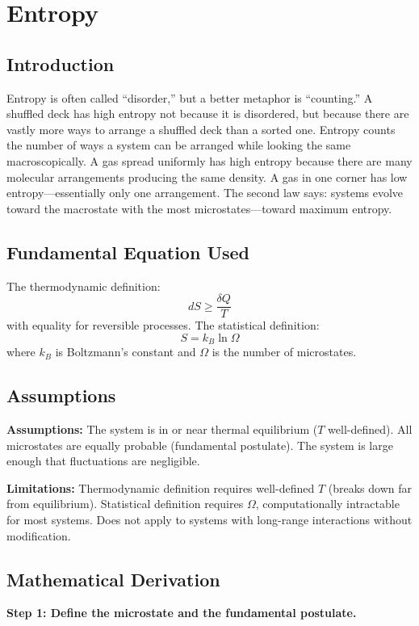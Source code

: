 \chapter{Entropy}

\section*{Introduction}

Entropy is often called ``disorder,'' but a better metaphor is ``counting.'' A shuffled deck has high entropy not because it is disordered, but because there are vastly more ways to arrange a shuffled deck than a sorted one. Entropy counts the number of ways a system can be arranged while looking the same macroscopically. A gas spread uniformly has high entropy because there are many molecular arrangements producing the same density. A gas in one corner has low entropy---essentially only one arrangement. The second law says: systems evolve toward the macrostate with the most microstates---toward maximum entropy.
\section*{Fundamental Equation Used}

The thermodynamic definition:
\[
dS \geq \frac{\delta Q}{T}
\]
with equality for reversible processes. The statistical definition:
\[
S = k_B \ln \Omega
\]
where $k_B$ is Boltzmann's constant and $\Omega$ is the number of microstates.
\section*{Assumptions}

\textbf{Assumptions:} The system is in or near thermal equilibrium ($T$ well-defined). All microstates are equally probable (fundamental postulate). The system is large enough that fluctuations are negligible.


\textbf{Limitations:} Thermodynamic definition requires well-defined $T$ (breaks down far from equilibrium). Statistical definition requires $\Omega$, computationally intractable for most systems. Does not apply to systems with long-range interactions without modification.


\section*{Mathematical Derivation}

\textbf{Step 1: Define the microstate and the fundamental postulate.}

